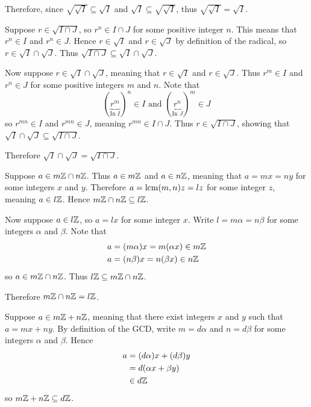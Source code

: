 \begin{questions}
\begin{partquestions}{\alph*}
        Therefore, since $\sqrt{\sqrt{I}} \subseteq \sqrt{I}$ and $\sqrt{I} \subseteq \sqrt{\sqrt{I}}$, thus $\sqrt{\sqrt{I}} = \sqrt{I}$.

        \item Suppose $r \in \sqrt{I\cap J}$, so $r^n \in I \cap J$ for some positive integer $n$. This means that $r^n \in I$ and $r^n \in J$. Hence $r \in \sqrt{I}$ and $r \in \sqrt{J}$ by definition of the radical, so $r \in \sqrt{I}\cap\sqrt{J}$. Thus $\sqrt{I\cap J} \subseteq \sqrt{I}\cap\sqrt{J}$.

        Now suppose $r \in \sqrt{I}\cap\sqrt{J}$, meaning that $r \in \sqrt{I}$ and $r \in \sqrt{J}$. Thus $r^m \in I$ and $r^n \in J$ for some positive integers $m$ and $n$. Note that
        \[
            (\underbrace{r^m}_{\text{In }I})^n \in I \text{ and } (\underbrace{r^n}_{\text{In }J})^m \in J
        \]
        so $r^{mn} \in I$ and $r^{mn} \in J$, meaning $r^{mn} \in I \cap J$. Thus $r \in \sqrt{I \cap J}$, showing that $\sqrt{I}\cap\sqrt{J} \subseteq \sqrt{I\cap J}$.

        Therefore $\sqrt{I}\cap\sqrt{J} = \sqrt{I\cap J}$.
    \end{partquestions}

    \item \begin{partquestions}{\alph*}
        \item Suppose $a \in m\mathbb{Z}\cap n\mathbb{Z}$. Thus $a \in m\mathbb{Z}$ and $a \in n\mathbb{Z}$, meaning that $a = mx = ny$ for some integers $x$ and $y$. Therefore $a = \mathrm{lcm}(m,n)z = lz$ for some integer $z$, meaning $a \in l\mathbb{Z}$. Hence $m\mathbb{Z} \cap n\mathbb{Z} \subseteq l\mathbb{Z}$.

        Now suppose $a \in l\mathbb{Z}$, so $a = lx$ for some integer $x$. Write $l = m\alpha = n\beta$ for some integers $\alpha$ and $\beta$. Note that
        \begin{align*}
            a &= (m\alpha)x = m(\alpha x) \in m\mathbb{Z}\\
            a &= (n\beta)x = n(\beta x) \in n\mathbb{Z}
        \end{align*}
        so $a \in m\mathbb{Z} \cap n\mathbb{Z}$. Thus $l\mathbb{Z} \subseteq m\mathbb{Z} \cap n\mathbb{Z}$.

        Therefore $m\mathbb{Z}\cap n\mathbb{Z} = l\mathbb{Z}$.

        \item Suppose $a \in m\mathbb{Z} + n\mathbb{Z}$, meaning that there exist integers $x$ and $y$ such that $a = mx + ny$. By definition of the GCD, write $m = d\alpha$ and $n = d\beta$ for some integers $\alpha$ and $\beta$. Hence
        \begin{align*}
            a &= (d\alpha)x + (d\beta)y\\
            &= d(\alpha x + \beta y)\\
            &\in d\mathbb{Z}
        \end{align*}
        so $m\mathbb{Z} + n\mathbb{Z} \subseteq d\mathbb{Z}$.


\end{partquestions}
\end{questions}
